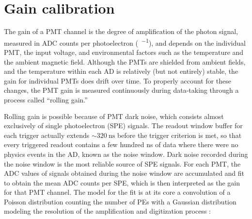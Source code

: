 \section{Gain calibration}
\label{sec:gain}

The gain of a PMT channel is the degree of amplification
of the photon signal,
measured in ADC counts per photoelectron (\si{\adc\per\pe}),
and depends on the individual PMT, the input voltage,
and environmental factors such as the temperature
and the ambient magnetic field.
Although the PMTs are shielded from ambient fields,
and the temperature within each AD is relatively (but not entirely) stable,
the gain for individual PMTs does drift over time.
To properly account for these changes,
the PMT gain is measured continuously during data-taking
through a process called ``rolling gain.''

Rolling gain is possible because of PMT dark noise,
which consists almost exclusively of single photoelectron (SPE) signals.
The readout window buffer for each trigger actually extends $\sim\SI{320}{\ns}$
before the trigger criterion is met,
so that every triggered readout contains a few hundred \si{\ns}
of data where there were no physics events in the AD, known as the noise window.
Dark noise recorded during the noise window is the most reliable source
of SPE signals.
For each PMT, the ADC values of signals obtained during the noise window
are accumulated and fit to obtain the mean ADC counts per SPE,
which is then interpreted as the gain for that PMT channel.
The model for the fit is at its core a convolution of
a Poisson distribution counting the number of PEs
with a Gaussian distribution modeling the resolution of
the amplification and digitization process \cite{ngd2016}:

